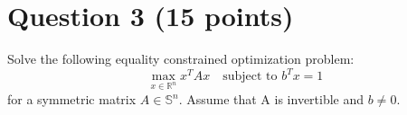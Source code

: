 \documentclass[
	10pt, %
]{../fphw}
\begin{document}
	
	\section*{Question 3 (15 points)}
	\begin{problem}
		Solve the following equality constrained optimization problem:
		\begin{equation*}
			\max_{x\in\mathbb{R}^n}x^TAx \quad \text{subject to } b^Tx = 1
		\end{equation*}
		for a symmetric matrix $A\in\mathbb{S}^n$. Assume that A is invertible and $b\ne 0$.
	\end{problem}
	
\end{document}
